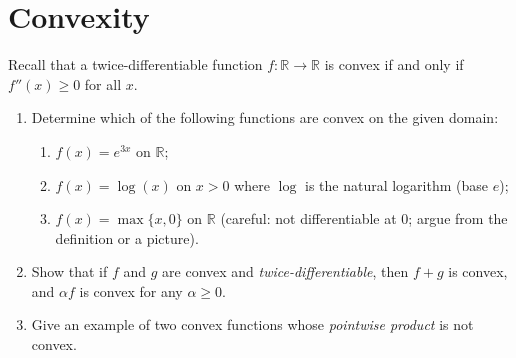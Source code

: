 \documentclass[letterpaper]{article}
\newcommand{\Real}{\mathbb{R}}
\newcommand{\opt}{^\star}
\begin{document}
\section{Convexity}
Recall that a twice-differentiable function $f\colon \Real \to \Real$ is convex if and only if $f''(x) \geq 0$ for all $x$.
\begin{enumerate}
\item Determine which of the following functions are convex on the given domain:
  \begin{enumerate}
  \item $f(x) = e^{3x}$ on $\Real$;
  \item $f(x) = \log(x)$ on $x > 0$ where $\log$ is the natural logarithm (base $e$);
  \item $f(x) = \max\{x, 0\}$ on $\Real$ (careful: not differentiable at $0$; argue from the definition or a picture).
  \end{enumerate}
\item Show that if $f$ and $g$ are convex and \emph{twice-differentiable}, then $f + g$ is convex, and $\alpha f$ is convex for any $\alpha \geq 0$.
\item Give an example of two convex functions whose \emph{pointwise product} is not convex.
\end{enumerate}

\end{document}
